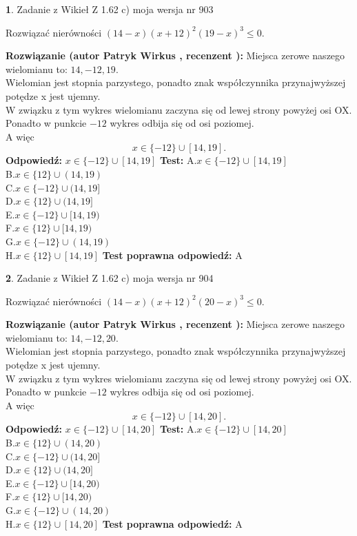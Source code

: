\documentclass[12pt, a4paper]{article}
\theoremstyle{definition} %
\newtheorem{zad}{}
\newcommand{\zadStart}[1]{\begin{zad}#1\newline}
\newcommand{\zadStop}{\end{zad}}
\newcommand{\rozwStart}[2]{\noindent \textbf{Rozwiązanie (autor #1 , recenzent #2): }\newline}
\newcommand{\rozwStop}{\newline}
\newcommand{\odpStart}{\noindent \textbf{Odpowiedź:}\newline}
\newcommand{\odpStop}{\newline}
\newcommand{\testStart}{\noindent \textbf{Test:}\newline}
\newcommand{\testStop}{\newline}
\newcommand{\kluczStart}{\noindent \textbf{Test poprawna odpowiedź:}\newline}
\newcommand{\kluczStop}{\newline}
\begin{document}
\zadStart{Zadanie z Wikieł Z 1.62 c) moja wersja nr 903}

Rozwiązać nierówności $(14-x)(x+12)^{2}(19-x)^{3}\le0$.
\zadStop
\rozwStart{Patryk Wirkus}{}
Miejsca zerowe naszego wielomianu to: $14, -12, 19$.\\
Wielomian jest stopnia parzystego, ponadto znak współczynnika przy\linebreak najwyższej potędze x jest ujemny.\\ W związku z tym wykres wielomianu zaczyna się od lewej strony powyżej osi OX.\\
Ponadto w punkcie $-12$ wykres odbija się od osi poziomej.\\
A więc $$x \in \{-12\} \cup [14,19].$$
\rozwStop
\odpStart
$x \in \{-12\} \cup [14,19]$
\odpStop
\testStart
A.$x \in \{-12\} \cup [14,19]$\\
B.$x \in \{12\} \cup (14,19)$\\
C.$x \in \{-12\} \cup (14,19]$\\
D.$x \in \{12\} \cup (14,19]$\\
E.$x \in \{-12\} \cup [14,19)$\\
F.$x \in \{12\} \cup [14,19)$\\
G.$x \in \{-12\} \cup (14,19)$\\
H.$x \in \{12\} \cup [14,19]$
\testStop
\kluczStart
A
\kluczStop



\zadStart{Zadanie z Wikieł Z 1.62 c) moja wersja nr 904}

Rozwiązać nierówności $(14-x)(x+12)^{2}(20-x)^{3}\le0$.
\zadStop
\rozwStart{Patryk Wirkus}{}
Miejsca zerowe naszego wielomianu to: $14, -12, 20$.\\
Wielomian jest stopnia parzystego, ponadto znak współczynnika przy\linebreak najwyższej potędze x jest ujemny.\\ W związku z tym wykres wielomianu zaczyna się od lewej strony powyżej osi OX.\\
Ponadto w punkcie $-12$ wykres odbija się od osi poziomej.\\
A więc $$x \in \{-12\} \cup [14,20].$$
\rozwStop
\odpStart
$x \in \{-12\} \cup [14,20]$
\odpStop
\testStart
A.$x \in \{-12\} \cup [14,20]$\\
B.$x \in \{12\} \cup (14,20)$\\
C.$x \in \{-12\} \cup (14,20]$\\
D.$x \in \{12\} \cup (14,20]$\\
E.$x \in \{-12\} \cup [14,20)$\\
F.$x \in \{12\} \cup [14,20)$\\
G.$x \in \{-12\} \cup (14,20)$\\
H.$x \in \{12\} \cup [14,20]$
\testStop
\kluczStart
A
\kluczStop
\end{document}
